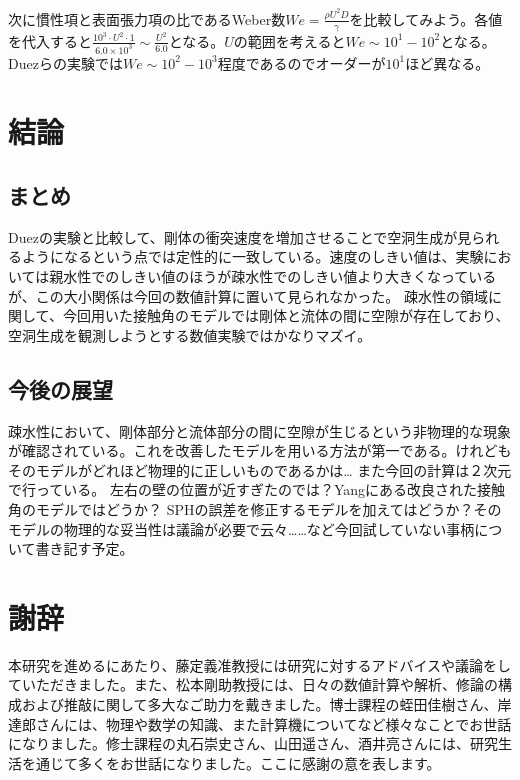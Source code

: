 \documentclass[]{jsarticle}
\begin{document}
次に慣性項と表面張力項の比であるWeber数$We=\frac{\rho U^2 D}{\gamma}$を比較してみよう。各値を代入すると$\frac{10^3\cdot U^2 \cdot 1}{6.0\times10^3}\sim \frac{U^2}{6.0}$となる。$U$の範囲を考えると$We\sim 10^1 -10^2$となる。Duezらの実験では$We\sim10^2-10^3$程度であるのでオーダーが$10^1$ほど異なる。



\newpage
\section{結論}
\subsection{まとめ}
Duezの実験と比較して、剛体の衝突速度を増加させることで空洞生成が見られるようになるという点では定性的に一致している。速度のしきい値は、実験においては親水性でのしきい値のほうが疎水性でのしきい値より大きくなっているが、この大小関係は今回の数値計算に置いて見られなかった。
疎水性の領域に関して、今回用いた接触角のモデルでは剛体と流体の間に空隙が存在しており、空洞生成を観測しようとする数値実験ではかなりマズイ。

\subsection{今後の展望}
疎水性において、剛体部分と流体部分の間に空隙が生じるという非物理的な現象が確認されている。これを改善したモデルを用いる方法が第一である。けれどもそのモデルがどれほど物理的に正しいものであるかは…
また今回の計算は２次元で行っている。
左右の壁の位置が近すぎたのでは？Yang\cite{Yang2017}にある改良された接触角のモデルではどうか？
SPHの誤差を修正するモデルを加えてはどうか？そのモデルの物理的な妥当性は議論が必要で云々……など今回試していない事柄について書き記す予定。
\newpage

\section{謝辞}
本研究を進めるにあたり、藤定義准教授には研究に対するアドバイスや議論をしていただきました。また、松本剛助教授には、日々の数値計算や解析、修論の構成および推敲に関して多大なご助力を戴きました。博士課程の蛭田佳樹さん、岸達郎さんには、物理や数学の知識、また計算機についてなど様々なことでお世話になりました。修士課程の丸石崇史さん、山田遥さん、酒井亮さんには、研究生活を通じて多くをお世話になりました。ここに感謝の意を表します。
\newpage



\end{document}
